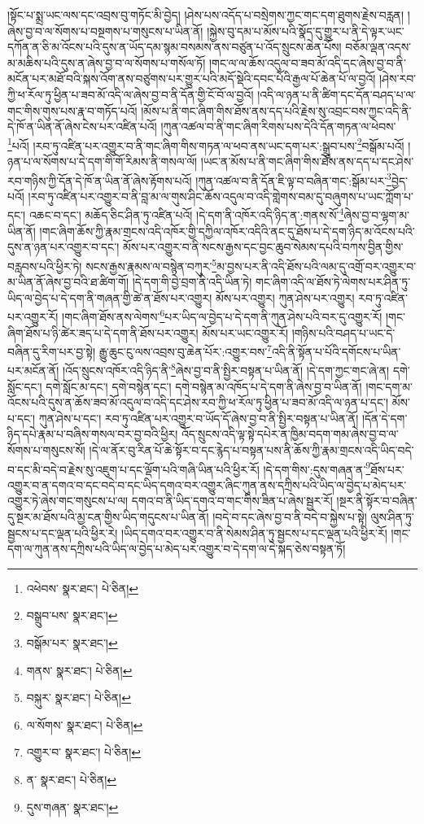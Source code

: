 །སྟོང་པ་སྨྲ་ཡང་ལས་དང་འབྲས་བུ་གཏོང་མི་བྱེད། །ཤེས་པས་འདོད་པ་བསྲེགས་ཀྱང་གང་དག་ཐུགས་རྗེས་བརླན། །ཞེས་བྱ་བ་ལ་སོགས་པ་བསྔགས་པ་གསུངས་པ་ཡིན་ནོ། །སྐྱེས་བུ་དམ་པ་མོས་པའི་སྣོད་དུ་གྱུར་པ་ནི་དེ་ལྟར་ཡང་དཀོན་ན་ཅི་མ་འོངས་པའི་དུས་ན་ཡོད་དམ་སྙམ་བསམས་ནས་བཙུན་པ་འོད་སྲུངས་ཆེན་པོས། བཅོམ་ལྡན་འདས་མ་མཆིས་པའི་དུས་ན་ཞེས་བྱ་བ་ལ་སོགས་པ་གསོལ་ཏོ། །གང་ལ་ལ་ཆོས་འདུལ་བ་ཟབ་མོ་འདི་དང་ཞེས་བྱ་བ་ནི་མངོན་པར་མཐོ་བའི་སྐས་འོག་ནས་བཙུགས་པར་གྱུར་པའི་མདོ་སྡེའི་དབང་པོའི་རྒྱལ་པོ་ཆེན་པོ་ལ་བྱའོ། །ཤེས་རབ་ཀྱི་ཕ་རོལ་ཏུ་ཕྱིན་པ་ཟབ་མོ་འདི་ལ་ཞེས་བྱ་བ་ནི་དོན་གྱི་ངོ་བོ་ལ་བྱའོ། །འདི་ལ་ཉན་པ་ནི་ཚིག་དང་དོན་བཤད་པ་ལ་གང་གིས་གུས་པས་རྣ་བ་གཏོད་པའོ། །མོས་པ་ནི་གང་ཞིག་གིས་ཐོས་ནས་དད་པའི་རྗེས་སུ་འབྲང་བས་ཀྱང་འདི་ནི་དེ་ཁོ་ན་ཡིན་ནོ་ཞེས་ངེས་པར་འཛིན་པའོ། །ཀུན་འཚལ་བ་ནི་གང་ཞིག་རིགས་པས་དེའི་དོན་གཏན་ལ་ཕེབས་\footnote{འཕེབས་  སྣར་ཐང་།  པེ་ཅིན། }པའོ། །རབ་ཏུ་འཛིན་པར་འགྱུར་བ་ནི་གང་ཞིག་གིས་གཏན་ལ་ཕབ་ནས་ཡང་དག་པར་:སྒྲུབ་པས་\footnote{བསྒྲུབ་པས་  སྣར་ཐང་། }བསྒོམ་པའོ། །ཉན་པ་ལ་སོགས་པ་དེ་དག་གི་གོ་རིམས་ནི་གསལ་ལོ། །ཡང་ན་མོས་པ་ནི་གང་ཞིག་གིས་ཐོས་ནས་དད་པ་དང་ཤེས་རབ་གཉིས་ཀྱི་དོན་དེ་ཁོ་ན་ཡིན་ནོ་ཞེས་རྟོགས་པའོ། །ཀུན་འཚལ་བ་ནི་དོན་ཇི་ལྟ་བ་བཞིན་གང་:སྒོམ་པར་\footnote{བསྒོམ་པར་  སྣར་ཐང་། }བྱེད་པའོ། །རབ་ཏུ་འཛིན་པར་འགྱུར་བ་ནི་བླ་མ་ལ་གུས་ཤིང་ཆོས་འདུལ་བ་འདི་གླེགས་བམ་དུ་བཞུགས་པ་ཡང་ཀློག་པ་དང་། འཆང་བ་དང་། མཆོད་ཅིང་ཤིན་ཏུ་འཛིན་པའོ། །དེ་དག་ནི་འཁོར་འདི་ཉིད་ན་:གནས་སོ་\footnote{གནས་  སྣར་ཐང་།  པེ་ཅིན། }ཞེས་བྱ་བ་ལྷག་མ་ཡིན་ནོ། །གང་ཞིག་ཆོས་ཀྱི་རྣམ་གྲངས་འདི་འཁོར་གྱི་དཀྱིལ་འཁོར་འདིའི་ནང་དུ་ཐོས་པ་དེ་དག་ཉིད་མ་འོངས་པའི་དུས་ན་ཉན་པར་འགྱུར་བ་དང་། མོས་པར་འགྱུར་བ་ནི་སངས་རྒྱས་དང་བྱང་ཆུབ་སེམས་དཔའི་བཀས་བྱིན་གྱིས་བརླབས་པའི་ཕྱིར་ཏེ། སངས་རྒྱས་རྣམས་ལ་བསྙེན་བཀུར་\footnote{བསྐུར་  སྣར་ཐང་།  པེ་ཅིན། }མ་བྱས་པར་ནི་འདི་ཐོས་པའི་ལམ་དུ་འགྲོ་བར་འགྱུར་བ་མ་ཡིན་ནོ་ཞེས་བྱ་བའི་ཐ་ཚིག་གོ། །དེ་དག་གི་བྱེ་བྲག་ནི་འདི་ཡིན་ཏེ། གང་ཞིག་འདི་ལ་ཐོས་ཏེ་ལེགས་པར་ཤིན་ཏུ་ཡིད་ལ་བྱེད་པ་དེ་དག་ནི་གཞན་གྱི་ཚེ་ན་ཐོས་པར་འགྱུར། མོས་པར་འགྱུར། ཀུན་ཤེས་པར་འགྱུར། རབ་ཏུ་འཛིན་པར་འགྱུར་རོ། །གང་ཞིག་ཐོས་ནས་ལེགས་\footnote{ལ་སོགས་  སྣར་ཐང་།  པེ་ཅིན། }པར་ཡིད་ལ་བྱེད་པ་དེ་དག་ནི་ཀུན་ཤེས་པའི་བར་དུ་འགྱུར་རོ། །གང་ཞིག་ཐོས་པ་ཉི་ཚེར་ཟད་པ་དེ་དག་ནི་ཐོས་པར་འགྱུར། མོས་པར་ཡང་འགྱུར་རོ། །གཉིས་པའི་བཤད་པ་ཡང་དེ་བཞིན་དུ་རིག་པར་བྱ་སྟེ། རྒྱུ་ཆུང་ངུ་ལས་འབྲས་བུ་ཆེན་པོར་:འགྱུར་བས་\footnote{འགྱུར་བ་  སྣར་ཐང་།  པེ་ཅིན། }འདི་ནི་སྟོན་པ་པོའི་དགོངས་པ་ཡིན་པར་མངོན་ནོ། །འོད་སྲུངས་འཁོར་འདི་ཉིད་ནི་\footnote{ན་  སྣར་ཐང་།  པེ་ཅིན། }ཞེས་བྱ་བ་ནི་སྤྱིར་བསྟན་པ་ཡིན་ནོ། །དེ་དག་ཀྱང་གང་ཞེ་ན། དགེ་སློང་དང་། དགེ་སློང་མ་དང་། དགེ་བསྙེན་དང་། དགེ་བསྙེན་མ་འཁོད་པ་དེ་དག་ནི་ཞེས་བྱ་བ་ཡིན་ནོ། །གང་དག་མ་འོངས་པའི་དུས་ན་ཆོས་ཟབ་མོ་འདུལ་བ་འདི་དང་ཤེས་རབ་ཀྱི་ཕ་རོལ་ཏུ་ཕྱིན་པ་ཟབ་མོ་འདི་ལ་ཉན་པ་དང་། མོས་པ་དང་། ཀུན་ཤེས་པ་དང་། རབ་ཏུ་འཛིན་པར་འགྱུར་བ་ཡོད་དོ་ཞེས་བྱ་བ་ནི་སྤྱིར་བསྟན་པ་ཡིན་ནོ། །དོན་དེ་དག་ཉིད་དཔེ་རྣམ་པ་བཞིས་གསལ་བར་བྱ་བའི་ཕྱིར། འོད་སྲུངས་འདི་ལྟ་སྟེ་དཔེར་ན་ཁྱིམ་བདག་གམ་ཞེས་བྱ་བ་ལ་སོགས་པ་གསུངས་སོ། །དེ་ལ་ནོར་བུ་རིན་པོ་ཆེ་སྟོར་བ་དང་རྙེད་པ་བསྟན་པས་ནི་ཆོས་ཀྱི་རྣམ་གྲངས་འདི་ཡིད་བདེ་བ་དང་མི་བདེ་བ་རྗེས་སུ་འཇུག་པ་དང་ལྡོག་པའི་གཞི་ཡིན་པའི་ཕྱིར་རོ། །དེ་དག་གིས་:དུས་གཞན་ན་\footnote{དུས་གཞན་  སྣར་ཐང་། }ཐོས་པར་འགྱུར་བ་ན་དགའ་བ་དང་བདེ་བ་དང་ཡིད་དགའ་བར་འགྱུར་ཞིང་ཀུན་ནས་དཀྲིས་པའི་ཡིད་ལ་བྱེད་པ་མེད་པར་འགྱུར་ཏེ་ཞེས་གང་གསུངས་པ་ལ། དགའ་བ་ནི་ཡིད་དགའ་བ་གང་གིས་ཟིན་པ་ཞེས་སྦྱར་རོ། །སྔར་ནི་སྟོར་བ་བཞིན་དུ་སྔར་མ་ཐོས་པའི་མྱ་ངན་གྱིས་ཡིད་གདུངས་པ་ཡིན་ནོ། །བདེ་བ་དང་ཞེས་བྱ་བ་ནི་བདེ་བ་སྐྱེས་པ་སྟེ། ལུས་ཤིན་ཏུ་སྦྱངས་པ་དང་ལྡན་པའི་ཕྱིར་རེ། །ཡིད་དགའ་བར་འགྱུར་བ་ནི་སེམས་ཤིན་ཏུ་སྦྱངས་པ་དང་ལྡན་པའི་ཕྱིར་རོ། །གང་དག་ལ་ཀུན་ནས་དཀྲིས་པའི་ཡིད་ལ་བྱེད་པ་མེད་པར་འགྱུར་བ་དེ་དག་ལ་དེ་སྐད་ཅེས་བསྟན་ཏོ། 